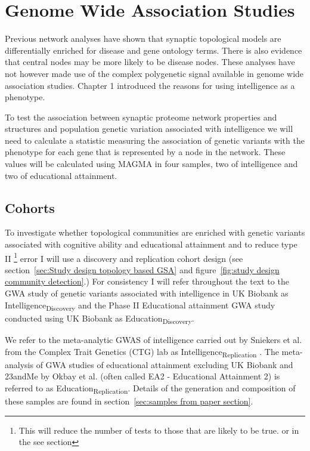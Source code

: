 \section{Genome Wide Association Studies}

Previous network analyses have shown that synaptic topological models are differentially enriched for disease and gene ontology terms. There is also evidence that central nodes may be more likely to be disease nodes. These analyses have not however made use of the complex polygenetic signal available in genome wide association studies. Chapter 1 introduced the reasons for using intelligence as a phenotype.

To test the association between synaptic proteome network properties and structures and population genetic variation associated with intelligence we will need to calculate a statistic measuring the association of genetic variants with the phenotype for each gene that is represented by a node in the network. These values will be calculated using MAGMA in four samples, two of intelligence and two of educational attainment.\cite{de2015magma}

\subsection{Cohorts}
\label{sec:cohorts from paper section}
To investigate whether topological communities are enriched with genetic variants associated with cognitive ability and educational attainment and to reduce type II \footnote{This will reduce the number of tests to those that are likely to be true. 
or in the see section} error I will use a discovery and replication cohort design (see section~\ref{sec:Study design topology based GSA} and figure~\ref{fig:study design community detection}.) 
For consistency I will refer throughout the text to the GWA study of genetic variants associated with intelligence in UK Biobank\cite{bycroft2018uk} as Intelligence\textsubscript{Discovery} and the Phase II Educational attainment GWA study conducted using UK Biobank as Education\textsubscript{Discovery}.

We refer to the meta-analytic GWAS of intelligence carried out by Sniekers et al. from the Complex Trait Genetics (CTG) lab as Intelligence\textsubscript{Replication} \cite{sniekers2017genome}.   The meta-analysis of GWA studies of educational attainment excluding UK Biobank and 23andMe by Okbay et al.\cite{okbay2016genome} (often called EA2 - Educational Attainment 2) is referred to as Education\textsubscript{Replication}. Details of the generation and composition of these samples are found in section~\ref{sec:samples from paper section}. 

